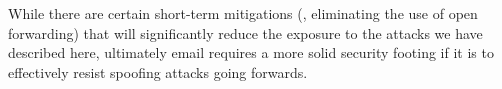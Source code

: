 While there are certain short-term mitigations (\eg, eliminating the use of
open forwarding) that will significantly reduce the exposure to the
attacks we have described here, ultimately email requires a more
solid security footing if it is to effectively resist spoofing
attacks going forwards.







